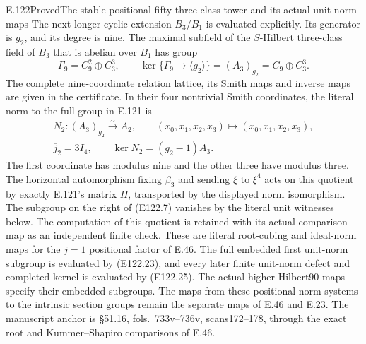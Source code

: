 \begin{statement}{E.122}{Proved}{The stable positional fifty-three class tower and its actual unit-norm maps}
The next longer cyclic extension $B_3/B_1$ is evaluated explicitly.
Its generator is $g_2$, and its degree is nine. The maximal subfield
of the $S$-Hilbert three-class field of $B_3$ that is abelian over
$B_1$ has group
\[
 \Gamma_9=C_9^2\oplus C_3^3,\qquad
 \ker\{\Gamma_9\longrightarrow\langle g_2\rangle\}
       =(A_3)_{g_2}=C_9\oplus C_3^3.
 \tag{E122.6}
\]
The complete nine-coordinate relation lattice, its Smith maps and
inverse maps are given in the certificate. In their four nontrivial
Smith coordinates, the literal norm to the full group in E.121 is
\[
 \begin{gathered}
 \overline N_2:(A_3)_{g_2}\xrightarrow{\sim}A_2,
       \qquad (x_0,x_1,x_2,x_3)\longmapsto(x_0,x_1,x_2,x_3),\\
 \overline j_2=3I_4,\qquad
 \ker N_2=(g_2-1)A_3.
 \end{gathered}
 \tag{E122.7}
\]
The first coordinate has modulus nine and the other three have modulus
three. The horizontal automorphism fixing $\beta_3$ and sending
$\xi$ to $\xi^4$ acts on this quotient by exactly E.121's matrix $H$,
transported by the displayed norm isomorphism. The subgroup on the
right of (E122.7) vanishes by the literal unit witnesses below.
The computation of this quotient is retained with its actual
comparison map as an independent finite check.
These are literal root-cubing and ideal-norm maps for the $j=1$
positional factor of E.46. The full embedded first unit-norm subgroup
is evaluated by (E122.23), and every later finite unit-norm defect
and completed kernel is evaluated by (E122.25). The actual higher
Hilbert90 maps specify their embedded subgroups. The maps from these
positional norm systems to the intrinsic section groups remain the
separate maps of E.46 and E.23.
The manuscript anchor is \S51.16, fols.~733v--736v, scans172--178,
through the exact root and Kummer--Shapiro comparisons of E.46.
\end{statement}

